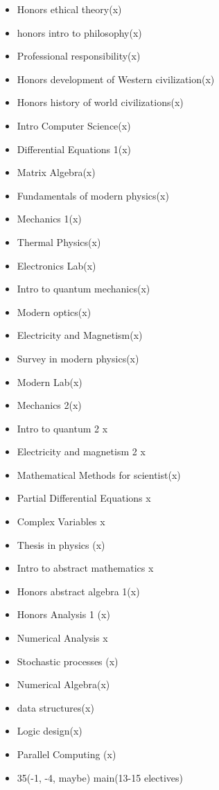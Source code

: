 \begin{itemize}
    \item Honors ethical theory(x)

    \item honors intro to philosophy(x)
    \item Professional responsibility(x)
    \item Honors development of Western civilization(x)
    \item Honors history of world civilizations(x)
    \item Intro Computer Science(x)
    \item Differential Equations 1(x)
    \item Matrix Algebra(x)
    \item Fundamentals of modern physics(x)
    \item Mechanics 1(x)
    \item Thermal Physics(x)
    \item Electronics Lab(x)
    \item Intro to quantum mechanics(x)
    \item Modern optics(x)
    \item Electricity and Magnetism(x)
    \item Survey in modern physics(x)
    \item Modern Lab(x)
    \item Mechanics 2(x)
    \item Intro to quantum 2 x
    \item Electricity and magnetism 2 x
    \item Mathematical Methods for scientist(x)
    \item Partial Differential Equations x
    \item Complex Variables x
    \item Thesis in physics (x)
    \item Intro to abstract mathematics x
    \item Honors abstract algebra 1(x)
    \item Honors Analysis 1 (x)
    \item Numerical Analysis x
    \item Stochastic processes (x)
    \item Numerical Algebra(x)
    \item data structures(x)
    \item Logic design(x)
    \item Parallel Computing (x)
    \item 35(-1, -4, maybe) main(13-15 electives)

\end{itemize}
